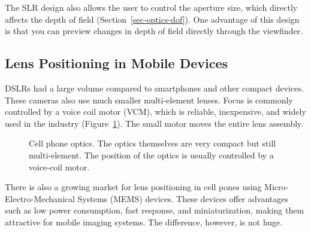\documentclass[
  letterpaper,
]{book}
\begin{document}
\begin{tcolorbox}
The SLR design also allows the user to control the aperture size, which
directly affects the depth of field (Section~\ref{sec-optics-dof}). One
advantage of this design is that you can preview changes in depth of
field directly through the viewfinder.

\end{tcolorbox}

\subsection{Lens Positioning in Mobile
Devices}\label{sec-lens-positioning-mobile}

DSLRs had a large volume compared to smartphones and other compact
devices. These cameras also use much smaller multi-element lenses. Focus
is commonly controlled by a voice coil motor (VCM), which is reliable,
inexpensive, and widely used in the industry
(Figure~\ref{fig-sensor-vcm}). The small motor moves the entire lens
assembly.

\begin{figure}


\caption{\label{fig-sensor-vcm}Cell phone optics. The optics themselves
are very compact but still multi-element. The position of the optics is
usually controlled by a voice-coil motor.}

\end{figure}%

There is also a growing market for lens positioning in cell pones using
Micro-Electro-Mechanical Systems (MEMS) devices. These devices offer
advantages such as low power consumption, fast response, and
miniaturization, making them attractive for mobile imaging systems. The
difference, however, is not huge.
\end{document}
